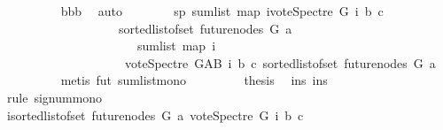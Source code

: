 \begin{isabellebody}
\ \ \ \ \ \ \ \ \isamarkupfalse%
\ bbb\ \isamarkupfalse%
\ auto\isanewline
\ \ \ \ \ \ \isamarkupfalse%
\ sp{}{\isacharcolon}{\kern0pt}\ {\isachardoublequoteopen}sum{\isacharunderscore}{\kern0pt}list\ {\isacharparenleft}{\kern0pt}map\ {\isacharparenleft}{\kern0pt}{\isasymlambda}i{\isachardot}{\kern0pt}{\isacharparenleft}{\kern0pt}vote{\isacharunderscore}{\kern0pt}Spectre\ G\ i\ b\ c{\isacharparenright}{\kern0pt}{\isacharparenright}{\kern0pt}\isanewline
\ \ \ \ \ \ \ \ \ \ \ \ \ \ \ \ \ \ \ {\isacharparenleft}{\kern0pt}sorted{\isacharunderscore}{\kern0pt}list{\isacharunderscore}{\kern0pt}of{\isacharunderscore}{\kern0pt}set\ {\isacharparenleft}{\kern0pt}future{\isacharunderscore}{\kern0pt}nodes\ G\ a{\isacharparenright}{\kern0pt}{\isacharparenright}{\kern0pt}{\isacharparenright}{\kern0pt}\ \isanewline
\ \ \ \ \ \ \ \ \ \ \ \ \ \ \ \ \ \ \ \ {\isasymle}\ \ sum{\isacharunderscore}{\kern0pt}list\ {\isacharparenleft}{\kern0pt}map\ {\isacharparenleft}{\kern0pt}{\isasymlambda}i{\isachardot}{\kern0pt}\isanewline
\ \ \ \ \ \ \ \ \ \ \ \ \ \ \ \ \ \ \ \ {\isacharparenleft}{\kern0pt}vote{\isacharunderscore}{\kern0pt}Spectre\ G{\isacharunderscore}{\kern0pt}AB\ i\ b\ c{\isacharparenright}{\kern0pt}{\isacharparenright}{\kern0pt}\ {\isacharparenleft}{\kern0pt}sorted{\isacharunderscore}{\kern0pt}list{\isacharunderscore}{\kern0pt}of{\isacharunderscore}{\kern0pt}set\ {\isacharparenleft}{\kern0pt}future{\isacharunderscore}{\kern0pt}nodes\ G\ a{\isacharparenright}{\kern0pt}{\isacharparenright}{\kern0pt}{\isacharparenright}{\kern0pt}{\isachardoublequoteclose}\isanewline
\ \ \ \ \ \ \ \ \isamarkupfalse%
\ {\isacharparenleft}{\kern0pt}metis\ fut\ sum{\isacharunderscore}{\kern0pt}list{\isacharunderscore}{\kern0pt}mono\ {\isacharparenright}{\kern0pt}\isanewline
\ \ \ \ \ \ \isamarkupfalse%
\ {\isacharquery}{\kern0pt}thesis\ \isamarkupfalse%
\ ins\ ins{}\isanewline
\ \ \ \ \ \ \isamarkupfalse%
\ {\isacharparenleft}{\kern0pt}rule\ signum{\isacharunderscore}{\kern0pt}mono{\isacharparenright}{\kern0pt}\isanewline
\ \ \ \ \ \ \ \ \isamarkupfalse%
\ {\isachardoublequoteopen}{\isacharparenleft}{\kern0pt}{\isasymSum}i{\isasymleftarrow}sorted{\isacharunderscore}{\kern0pt}list{\isacharunderscore}{\kern0pt}of{\isacharunderscore}{\kern0pt}set\ {\isacharparenleft}{\kern0pt}future{\isacharunderscore}{\kern0pt}nodes\ G\ a{\isacharparenright}{\kern0pt}{\isachardot}{\kern0pt}\ vote{\isacharunderscore}{\kern0pt}Spectre\ G\ i\ b\ c{\isacharparenright}{\kern0pt}\isanewline

\end{isabellebody}
